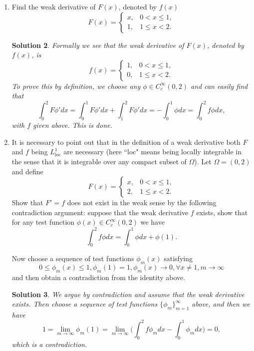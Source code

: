 \documentclass[6pt]{article}
\newtheorem{solution}{Solution}
\numberwithin{equation}{section}
\begin{document}
\begin{enumerate}
\begin{solution}
Remark:  The weak derivative is unique in the sense of measure zero, i.e., out of a region of zero measure.
\end{solution}

\item Find the weak derivative of $F(x)$, denoted by $f(x)$
\begin{equation}
F(x)=\left\{
\begin{array}{ll}
x,&0<x\leq1,\\
1,&1\leq x<2.
\end{array}
\right.
\end{equation}
\begin{solution}
Formally we see that the weak derivative of $F(x)$, denoted by $f(x)$, is
\begin{equation}
f(x)=\left\{
\begin{array}{ll}
1,&0<x\leq1,\\
0,&1\leq x<2.
\end{array}
\right.
\end{equation}
To prove this by definition, we choose any $\phi\in C^\infty_{c}(0,2)$ and can easily find that
\[\int_0^2F\phi'dx=\int_0^1F\phi'dx+\int_1^2 F\phi'dx=-\int_0^1\phi dx=\int_0^2 f\phi dx,\]
with $f$ given above.  This is done.
\end{solution}

\item It is necessary to point out that in the definition of a weak derivative both $F$ and $f$ being $L^1_{\text{loc}}$ are necessary (here ``loc" means being locally integrable in the sense that it is integrable over any compact subset of $\Omega$).  Let $\Omega=(0,2)$ and define
\begin{equation}
F(x)=\left\{
\begin{array}{ll}
x,&0<x\leq1,\\
2,&1\leq x<2.
\end{array}
\right.
\end{equation}
Show that $F'=f$ does not exist in the weak sense by the following contradiction argument: suppose that the weak derivative $f$ exists, show that for any test function $\phi(x)\in C^\infty_c(0,2)$ we have
\[\int_0^2f \phi dx=\int_0^1 \phi dx+\phi(1).\]

Now choose a sequence of test functions $\phi_m(x)$ satisfying
\[0\leq \phi_m(x)\leq 1, \phi_m(1)=1,\phi_m(x)\rightarrow 0, \forall x\neq1, m\rightarrow\infty\]
and then obtain  a contradiction from the identity above.
\begin{solution}
We argue by contradiction and assume that the weak derivative exists.  Then choose a sequence of test functions $\{\phi_m\}_{m=1}^\infty$ above, and then we have
\[1=\lim_{m\rightarrow \infty}\phi_m(1)=\lim_{m\rightarrow \infty}\Big(\int_0^2 f\phi_m dx-\int_0^1 \phi_mdx\Big)=0,\]
which is a contradiction.
\end{solution}


\end{enumerate}
\end{document}
